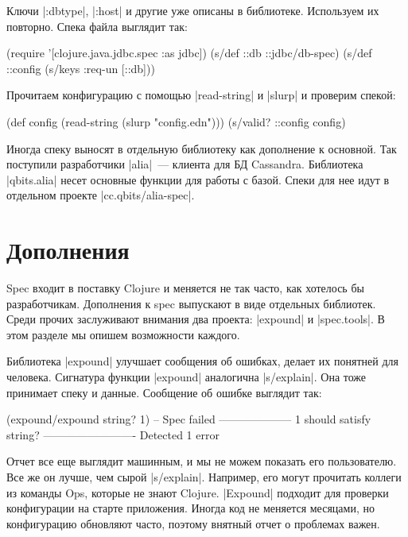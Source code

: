 Ключи \spverb|:dbtype|, \spverb|:host| и другие уже описаны в библиотеке.
Используем их повторно. Спека файла выглядит так:

\begin{english}
  \begin{clojure}
(require '[clojure.java.jdbc.spec :as jdbc])
(s/def ::db ::jdbc/db-spec)
(s/def ::config (s/keys :req-un [::db]))
  \end{clojure}
\end{english}

Прочитаем конфигурацию с помощью \spverb|read-string| и \spverb|slurp| и
проверим спекой:

\begin{english}
  \begin{clojure}
(def config (read-string (slurp "config.edn")))
(s/valid? ::config config)
  \end{clojure}
\end{english}

Иногда спеку выносят в отдельную библиотеку как дополнение к основной. Так
поступили разработчики \spverb|alia|~--- клиента для БД Cassandra. Библиотека
\spverb|qbits.alia| несет основные функции для работы с базой. Спеки для нее
идут в отдельном проекте \spverb|cc.qbits/alia-spec|.

\section{Дополнения}

Spec входит в поставку Clojure и меняется не так часто, как хотелось бы
разработчикам. Дополнения к spec выпускают в виде отдельных библиотек. Среди
прочих заслуживают внимания два проекта: \spverb|expound| и
\spverb|spec.tools|. В этом разделе мы опишем возможности каждого.

Библиотека \spverb|expound| улучшает сообщения
об ошибках, делает их понятней для человека. Сигнатура функции \spverb|expound|
аналогична \spverb|s/explain|. Она тоже принимает спеку и данные. Сообщение об
ошибке выглядит так:

\begin{english}
  \begin{clojure}
(expound/expound string? 1)
-- Spec failed --------------------
  1
should satisfy
  string?
-------------------------
Detected 1 error
  \end{clojure}
\end{english}

Отчет все еще выглядит машинным, и мы не можем показать его пользователю. Все же
он лучше, чем сырой \spverb|s/explain|. Например, его могут прочитать коллеги из
команды Ops, которые не знают Clojure. \spverb|Expound| подходит для проверки
конфигурации на старте приложения. Иногда код не меняется месяцами, но
конфигурацию обновляют часто, поэтому внятный отчет о проблемах важен.

